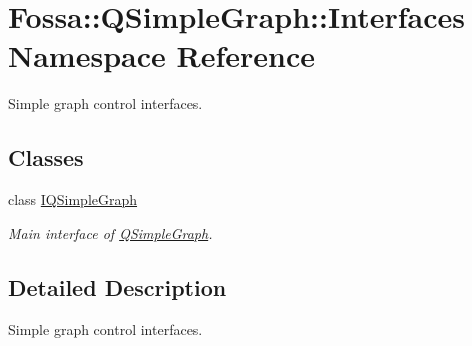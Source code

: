 \hypertarget{namespace_fossa_1_1_q_simple_graph_1_1_interfaces}{}\section{Fossa\+:\+:Q\+Simple\+Graph\+:\+:Interfaces Namespace Reference}
\label{namespace_fossa_1_1_q_simple_graph_1_1_interfaces}


Simple graph control interfaces.  


\subsection*{Classes}
\begin{DoxyCompactItemize}
\item 
class \hyperlink{class_fossa_1_1_q_simple_graph_1_1_interfaces_1_1_i_q_simple_graph}{I\+Q\+Simple\+Graph}
\begin{DoxyCompactList}\small\item\em Main interface of \hyperlink{class_fossa_1_1_q_simple_graph_1_1_q_simple_graph}{Q\+Simple\+Graph}. \end{DoxyCompactList}\end{DoxyCompactItemize}


\subsection{Detailed Description}
Simple graph control interfaces. 